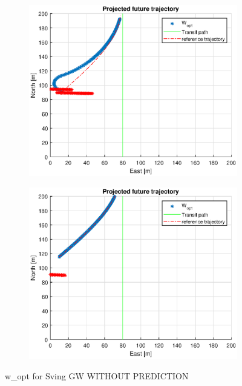 \begin{figure}
\begin{subfigure}[b]{0.499\textwidth}
    \end{subfigure}
    \hfill
    \\
    \begin{subfigure}[b]{0.49\textwidth}
        \centering
        \includegraphics[width=\textwidth]{Images/Figures/sving_GW/simple1_f999_frame5}
    \end{subfigure}
    \hfill
    \begin{subfigure}[b]{0.49\textwidth}
        \centering
        \includegraphics[width=\textwidth]{Images/Figures/sving_GW/simple1_f999_frame6}
    \end{subfigure}
    \caption{w\_opt for Sving GW WITHOUT PREDICTION}
\end{figure} 


